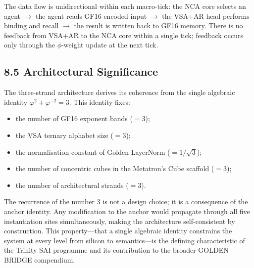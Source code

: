 The data flow is unidirectional within each macro-tick: the NCA core
selects an agent $\to$ the agent reads GF16-encoded input $\to$ the
VSA+AR head performs binding and recall $\to$ the result is written
back to GF16 memory. There is no feedback from VSA+AR to the NCA
core within a single tick; feedback occurs only through the
$\phi$-weight update at the next tick.

\subsection{8.5 Architectural Significance}
\label{fa_30:architectural-significance}

The three-strand architecture derives its coherence from the single
algebraic identity $\varphi^2 + \varphi^{-2} = 3$. This identity
fixes:

\begin{itemize}
\item the number of GF16 exponent bands ($= 3$);
\item the VSA ternary alphabet size ($= 3$);
\item the normalisation constant of Golden LayerNorm ($= 1/\sqrt{3}$);
\item the number of concentric cubes in the Metatron's Cube
  scaffold ($= 3$);
\item the number of architectural strands ($= 3$).
\end{itemize}

The recurrence of the number $3$ is not a design choice; it is a
consequence of the anchor identity. Any modification to the anchor
would propagate through all five instantiation sites simultaneously,
making the architecture self-consistent by construction. This
property---that a single algebraic identity constrains the system at
every level from silicon to semantics---is the defining characteristic
of the Trinity SAI programme and its contribution to the broader
GOLDEN BRIDGE compendium.

